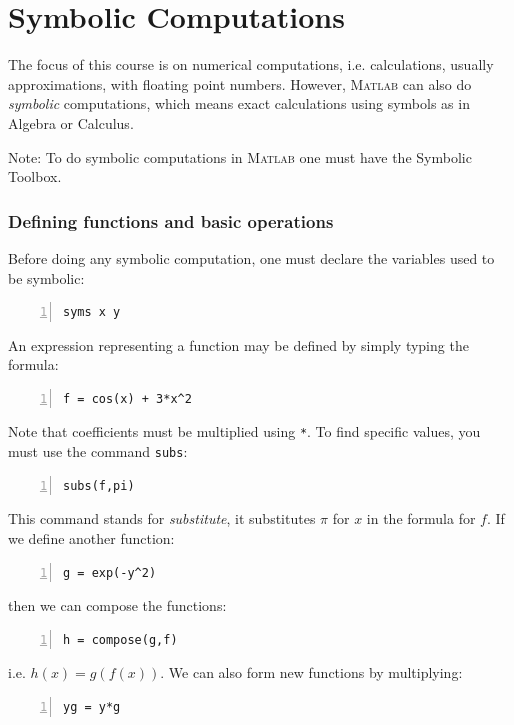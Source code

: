 
\chapter{Symbolic Computations}

The focus of this course is on {numerical} computations, i.e.
calculations, usually approximations, with floating point numbers.
However, \textsc{Matlab}
can also do {\em symbolic} computations, which means exact
calculations using symbols as in Algebra or Calculus.

Note: To do symbolic computations in \textsc{Matlab} one must
have the Symbolic Toolbox.


\subsection*{Defining functions and basic operations}

Before doing any symbolic computation, one must declare the
variables used to be symbolic:
\begin{lstlisting}[frame=none,numbers=left]
syms x y
\end{lstlisting}
An expression representing a function may be defined by simply typing the formula:
\begin{lstlisting}[frame=none,numbers=left]
f = cos(x) + 3*x^2
\end{lstlisting}
Note that coefficients must be multiplied using \verb&*&.
To find specific values, you must use the command \verb&subs&:
\begin{lstlisting}[frame=none,numbers=left]
subs(f,pi)
\end{lstlisting}
This command stands for {\em substitute}, it substitutes $\pi$ for $x$
in the formula for $f$.
%
If we define another function:
\begin{lstlisting}[frame=none,numbers=left]
g = exp(-y^2)
\end{lstlisting}
then we can compose the functions:
\begin{lstlisting}[frame=none,numbers=left]
h = compose(g,f)
\end{lstlisting}
i.e. $h(x) = g(f(x))$.
We can also form new functions by multiplying:
\begin{lstlisting}[frame=none,numbers=left]
yg = y*g
\end{lstlisting}

